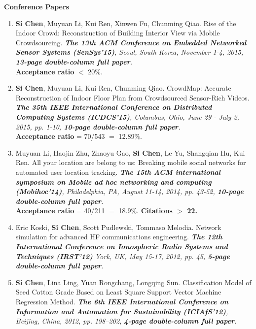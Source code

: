 \documentclass[letter]{article}
\newcommand{\publication}[4]{\item #1. #2. \emph{#3.} #4}
\begin{document}
\begin{description}





\textbf{Conference Papers}

\begin{enumerate}[{C-}1.]

\publication{\textbf{Si Chen}, Muyuan Li, Kui Ren, Xinwen Fu, Chunming Qiao} {Rise of the Indoor Crowd: Reconstruction of Building Interior View via Mobile Crowdsourcing}  {\textbf{The 13th ACM Conference on Embedded Networked Sensor Systems (SenSys'15)}, Seoul, South Korea, November 1-4, 2015, \textbf{13-page double-column full paper}} \\
\textbf{Acceptance ratio} $<$ 20\%.

\publication{\textbf{Si Chen}, Muyuan Li, Kui Ren, Chunming Qiao} {CrowdMap: Accurate Reconstruction of Indoor Floor Plan from Crowdsourced Sensor-Rich Videos}  {\textbf{The 35th IEEE International Conference on Distributed Computing Systems (ICDCS'15)}, Columbus, Ohio, June 29 - July 2, 2015, pp. 1-10, \textbf{10-page double-column full paper}} {} \\
\textbf{Acceptance ratio} = 70/543 $=$ 12.89\%.

\publication{Muyuan Li, Haojin Zhu, Zhaoyu Gao, \textbf{Si Chen}, Le Yu, Shangqian Hu, Kui Ren} {All your location are belong to us: Breaking mobile social networks for automated user location tracking}  {\textbf{The 15th ACM international symposium on Mobile ad hoc networking and computing (Mobihoc'14)}, Philadelphia, PA, August 11-14, 2014, pp. 43-52, \textbf{10-page double-column full paper}} \\
\textbf{Acceptance ratio} = 40/211 $=$ 18.9\%. \textbf{Citations $>$ 22.}

\publication{Eric Koski, \textbf{Si Chen}, Scott Pudlewski, Tommaso Melodia} {Network simulation for advanced HF communications engineering}  {\textbf{The 12th International Conference on Ionospheric Radio Systems and Techniques (IRST'12)} York, UK, May 15-17, 2012, pp. 45, \textbf{5-page double-column full paper}}

\publication{\textbf{Si Chen}, Lina Ling, Yuan Rongchang, Longqing Sun} {Classification Model of Seed Cotton Grade Based on Least Square Support Vector Machine Regression Method}  {\textbf{The 6th IEEE International Conference on Information and Automation for Sustainability (ICIAfS'12)}, Beijing, China, 2012, pp. 198--202, \textbf{4-page double-column full paper}} 


\end{enumerate}
\end{description}
\end{document}
